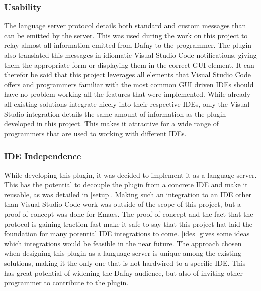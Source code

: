 \subsubsection{Usability}
The language server protocol details both standard and custom messages than can be emitted by the server. This was used during the work on this project to relay almost all information emitted from Dafny to the programmer. The plugin also translated this messages in idiomatic Visual Studio Code notifications, giving them the appropriate form or displaying them in the correct GUI element. It can therefor be said that this project leverages all elements that Visual Studio Code offers and programmers familiar with the most common GUI driven IDEs should have no problem working all the features that were implemented. \newline
While already all existing solutions integrate nicely into their respective IDEs, only the Visual Studio integration details the same amount of information as the plugin developed in this project. This makes it attractive for a wide range of programmers that are used to working with different IDEs. 

\subsubsection{IDE Independence}
While developing this plugin, it was decided to implement it as a language server. This has the potential to decouple the plugin from a concrete IDE and make it reusable, as was detailed in \ref{setup}. Making such an integration to an IDE other than Visual Studio Code work was outside of the scope of this project, but a proof of concept was done for Emacs. \newline
The proof of concept and the fact that the protocol is gaining traction fast make it safe to say that this project hat laid the foundation for many potential IDE integrations to come. \ref{ides} gives some ideas which integrations would be feasible in the near future. \newline
The approach chosen when designing this plugin as a language server is unique among the existing solutions, making it the only one that is not hardwired to a specific IDE. This has great potential of widening the Dafny audience, but also of inviting other programmer to contribute to the plugin.

